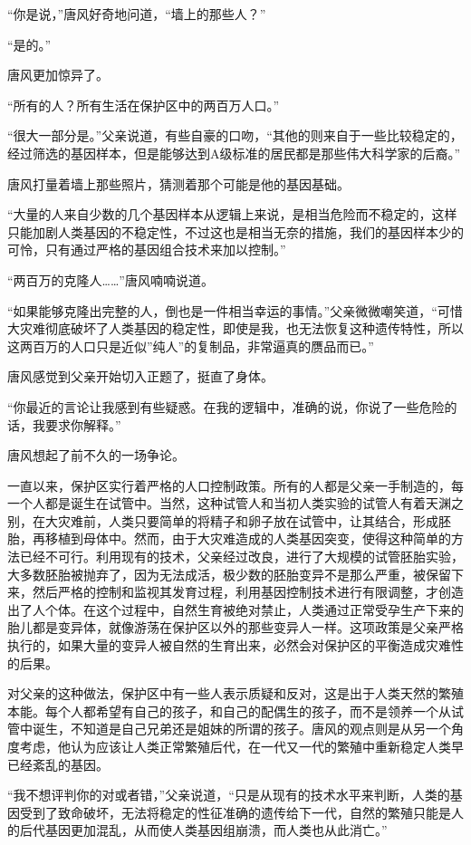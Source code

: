 “你是说，”唐风好奇地问道，“墙上的那些人？”

“是的。”

唐风更加惊异了。

“所有的人？所有生活在保护区中的两百万人口。”

“很大一部分是。”父亲说道，有些自豪的口吻，“其他的则来自于一些比较稳定的，经过筛选的基因样本，但是能够达到A级标准的居民都是那些伟大科学家的后裔。”

唐风打量着墙上那些照片，猜测着那个可能是他的基因基础。

“大量的人来自少数的几个基因样本从逻辑上来说，是相当危险而不稳定的，这样只能加剧人类基因的不稳定性，不过这也是相当无奈的措施，我们的基因样本少的可怜，只有通过严格的基因组合技术来加以控制。”

“两百万的克隆人……”唐风喃喃说道。

“如果能够克隆出完整的人，倒也是一件相当幸运的事情。”父亲微微嘲笑道，“可惜大灾难彻底破坏了人类基因的稳定性，即使是我，也无法恢复这种遗传特性，所以这两百万的人口只是近似”纯人”的复制品，非常逼真的赝品而已。”

唐风感觉到父亲开始切入正题了，挺直了身体。

“你最近的言论让我感到有些疑惑。在我的逻辑中，准确的说，你说了一些危险的话，我要求你解释。”

唐风想起了前不久的一场争论。

一直以来，保护区实行着严格的人口控制政策。所有的人都是父亲一手制造的，每一个人都是诞生在试管中。当然，这种试管人和当初人类实验的试管人有着天渊之别，在大灾难前，人类只要简单的将精子和卵子放在试管中，让其结合，形成胚胎，再移植到母体中。然而，由于大灾难造成的人类基因突变，使得这种简单的方法已经不可行。利用现有的技术，父亲经过改良，进行了大规模的试管胚胎实验，大多数胚胎被抛弃了，因为无法成活，极少数的胚胎变异不是那么严重，被保留下来，然后严格的控制和监视其发育过程，利用基因控制技术进行有限调整，才创造出了人个体。在这个过程中，自然生育被绝对禁止，人类通过正常受孕生产下来的胎儿都是变异体，就像游荡在保护区以外的那些变异人一样。这项政策是父亲严格执行的，如果大量的变异人被自然的生育出来，必然会对保护区的平衡造成灾难性的后果。

对父亲的这种做法，保护区中有一些人表示质疑和反对，这是出于人类天然的繁殖本能。每个人都希望有自己的孩子，和自己的配偶生的孩子，而不是领养一个从试管中诞生，不知道是自己兄弟还是姐妹的所谓的孩子。唐风的观点则是从另一个角度考虑，他认为应该让人类正常繁殖后代，在一代又一代的繁殖中重新稳定人类早已经紊乱的基因。

“我不想评判你的对或者错，”父亲说道，“只是从现有的技术水平来判断，人类的基因受到了致命破坏，无法将稳定的性征准确的遗传给下一代，自然的繁殖只能是人的后代基因更加混乱，从而使人类基因组崩溃，而人类也从此消亡。”

